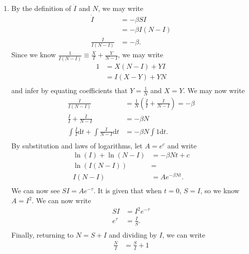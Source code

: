 \documentclass[10pt]{article}
\newcommand*{\dt}{\text{d}t}
\begin{document}
\begin{enumerate}
\begin{enumerate}
          \item By the definition of $\dot I$ and $N$, we may write
            \begin{align*} \label{I}
              \dot I &= -\beta SI \\
                     &= -\beta I(N - I) \\
              \frac{\dot I}{I(N - I)} &= -\beta.
            \end{align*}
            Since we know $\tfrac{1}{I(N - I)} \equiv \tfrac{X}{I} + \tfrac{Y}{N - I}$, we may write
            \begin{align*}
              1 &= X(N - I) + YI \\
                &= I(X - Y) + YN \\
            \end{align*}
            and infer by equating coefficients that
            $Y = \tfrac{1}{N}$ and $X = Y$. We may now write
            \begin{align*}
              \frac{\dot I}{I(N - I)} &= \frac{1}{N}\left(\frac{\dot I}{I} + \frac{\dot I}{N - I} \right) = -\beta \\
              \frac{\dot I}{I} + \frac{\dot I}{N - I} &= -\beta N \\
              \int \frac{\dot I}{I} \dt + \int \frac{\dot I}{N - I} \dt &= -\beta N \int 1 \dt. \\
            \end{align*}
            By substitution and laws of logarithms, let $A = e^c$ and write
            \begin{align*}
              \ln(I) + \ln(N -I) &= -\beta N t + c \\ 
              \ln(I(N -I)) &= \\
              I(N -I) &= Ae^{-\beta N t}.\\
            \end{align*}
            We can now see $SI = Ae^{-\tau}$. It is given that when $t = 0$, 
            $S = I$, so we know $A = I^2$. We can now write \begin{align*}
              SI &= I^2e^{-\tau} \\
                    e^\tau &= \frac{I}{S}. \\
            \end{align*}
            Finally, returning to $N = S + I$ and dividing by $I$, we can write
            \begin{align*}
              \frac{N}{I} &= \frac{S}{I} + 1 \\

\end{align*}
\end{enumerate}
\end{enumerate}
\end{document}
